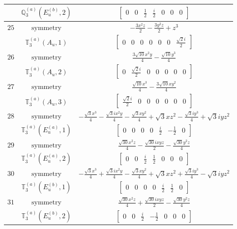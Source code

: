 \documentclass[fleqn,8pt,landscape]{jsarticle}
\begin{document}
\begin{longtable}{ccc}
$  $ & $ \mathbb{Q}_{3}^{(a)}(E_{u}^{(b)},2) $ & $ \begin{bmatrix} 0 & 0 & \frac{1}{2} & \frac{i}{2} & 0 & 0 & 0 \end{bmatrix} $ \\ \hline
$ 25 $ & $ \text{symmetry} $ & $ - \frac{3 x^{2} z}{2} - \frac{3 y^{2} z}{2} + z^{3} $ \\
$  $ & $ \mathbb{T}_{3}^{(a)}(A_{u},1) $ & $ \begin{bmatrix} 0 & 0 & 0 & 0 & 0 & 0 & \frac{\sqrt{2} i}{2} \end{bmatrix} $ \\ \hline
$ 26 $ & $ \text{symmetry} $ & $ \frac{3 \sqrt{10} x^{2} y}{4} - \frac{\sqrt{10} y^{3}}{4} $ \\
$  $ & $ \mathbb{T}_{3}^{(a)}(A_{u},2) $ & $ \begin{bmatrix} 0 & \frac{\sqrt{2} i}{2} & 0 & 0 & 0 & 0 & 0 \end{bmatrix} $ \\ \hline
$ 27 $ & $ \text{symmetry} $ & $ \frac{\sqrt{10} x^{3}}{4} - \frac{3 \sqrt{10} x y^{2}}{4} $ \\
$  $ & $ \mathbb{T}_{3}^{(a)}(A_{u},3) $ & $ \begin{bmatrix} \frac{\sqrt{2} i}{2} & 0 & 0 & 0 & 0 & 0 & 0 \end{bmatrix} $ \\ \hline
$ 28 $ & $ \text{symmetry} $ & $ - \frac{\sqrt{3} x^{3}}{4} - \frac{\sqrt{3} i x^{2} y}{4} - \frac{\sqrt{3} x y^{2}}{4} + \sqrt{3} x z^{2} - \frac{\sqrt{3} i y^{3}}{4} + \sqrt{3} i y z^{2} $ \\
$  $ & $ \mathbb{T}_{3}^{(a)}(E_{u}^{(a)},1) $ & $ \begin{bmatrix} 0 & 0 & 0 & 0 & \frac{i}{2} & - \frac{1}{2} & 0 \end{bmatrix} $ \\ \hline
$ 29 $ & $ \text{symmetry} $ & $ \frac{\sqrt{30} x^{2} z}{4} - \frac{\sqrt{30} i x y z}{2} - \frac{\sqrt{30} y^{2} z}{4} $ \\
$  $ & $ \mathbb{T}_{3}^{(a)}(E_{u}^{(a)},2) $ & $ \begin{bmatrix} 0 & 0 & \frac{i}{2} & \frac{1}{2} & 0 & 0 & 0 \end{bmatrix} $ \\ \hline
$ 30 $ & $ \text{symmetry} $ & $ - \frac{\sqrt{3} x^{3}}{4} + \frac{\sqrt{3} i x^{2} y}{4} - \frac{\sqrt{3} x y^{2}}{4} + \sqrt{3} x z^{2} + \frac{\sqrt{3} i y^{3}}{4} - \sqrt{3} i y z^{2} $ \\
$  $ & $ \mathbb{T}_{3}^{(a)}(E_{u}^{(b)},1) $ & $ \begin{bmatrix} 0 & 0 & 0 & 0 & \frac{i}{2} & \frac{1}{2} & 0 \end{bmatrix} $ \\ \hline
$ 31 $ & $ \text{symmetry} $ & $ \frac{\sqrt{30} x^{2} z}{4} + \frac{\sqrt{30} i x y z}{2} - \frac{\sqrt{30} y^{2} z}{4} $ \\
$  $ & $ \mathbb{T}_{3}^{(a)}(E_{u}^{(b)},2) $ & $ \begin{bmatrix} 0 & 0 & \frac{i}{2} & - \frac{1}{2} & 0 & 0 & 0 \end{bmatrix} $ \\ \hline
\end{longtable}
\end{document}
